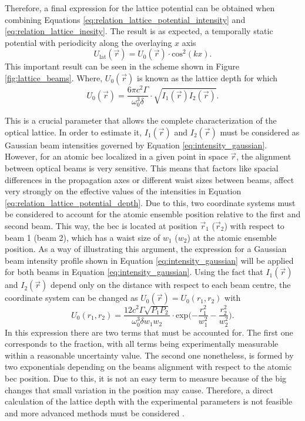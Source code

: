 Therefore, a final expression for the lattice potential can be obtained when combining Equations \eqref{eq:relation_lattice_potential_intensity} and \eqref{eq:relation_lattice_inesity}. The result is as expected, a temporally static potential with periodicity along the overlaying $x$ axis
\begin{equation}\label{eq:relation_lattice_potential}
	U_{\text{lat}}(\vec{r}) = U_{0}(\vec{r}) \cdot \text{cos}^2(kx).
\end{equation} 
This important result can be seen in the scheme shown in Figure \ref{fig:lattice_beams}. Where, $U_{0}(\vec{r})$ is known as the lattice depth for which
\begin{equation}\label{eq:relation_lattice_potential_depth}
	U_{0}(\vec{r}) = \frac{6\pi c^2 \Gamma}{\omega_0^3 \delta} \cdot \sqrt{I_{1}(\vec{r})I_{2}(\vec{r})}.
\end{equation} 

This is a crucial parameter that allows the complete characterization of the optical lattice. In order to estimate it, $I_{1}(\vec{r})$ and $I_{2}(\vec{r})$ must be considered as Gaussian beam intensities governed by Equation \eqref{eq:intensity_gaussian}. However, for an atomic \ac{bec} localized in a given point in space $\vec{r}$, the alignment between optical beams is very sensitive. This means that factors like spacial differences in the propagation axes or different waist sizes between beams, affect very strongly on the effective values of the intensities in Equation \eqref{eq:relation_lattice_potential_depth}. Due to this, two coordinate systems must be considered to account for the atomic ensemble position relative to the first and second beam. This way, the \ac{bec} is located at position $\vec{r}_1$ ($\vec{r}_2$) with respect to beam 1 (beam 2), which has a waist size of $w_1$ ($w_2$) at the atomic ensemble position. As a way of illustrating this argument, the expression for a Gaussian beam intensity profile shown in Equation \eqref{eq:intensity_gaussian} will be applied for both beams in Equation \eqref{eq:intensity_gaussian}. Using the fact that $I_{1}(\vec{r})$ and $I_{2}(\vec{r})$ depend only on the distance with respect to each beam centre, the coordinate system can be changed as $U_{0}(\vec{r})=U_{0}(r_1,r_2)$ with
\begin{equation}\label{eq:relation_lattice_potential_depth_final}
	U_{0}(r_1,r_2) = \frac{12 c^2 \Gamma\sqrt{P_1 P_2}}{\omega_0^3 \delta w_1 w_2} \cdot \text{exp}\bigg({-\frac{r_1^2}{w_1^2}-\frac{r_2^2}{w_2^2}}\bigg).
\end{equation} 
In this expression there are two terms that must be accounted for. The first one corresponds to the fraction, with all terms being experimentally measurable within a reasonable uncertainty value. The second one nonetheless, is formed by two exponentials depending on the beams alignment with respect to the atomic \ac{bec} position. Due to this, it is not an easy term to measure because of the big changes that small variation in the position may cause. Therefore, a direct calculation of the lattice depth with the experimental parameters is not feasible and more advanced methods must be considered \cite{Kadau2011}.

